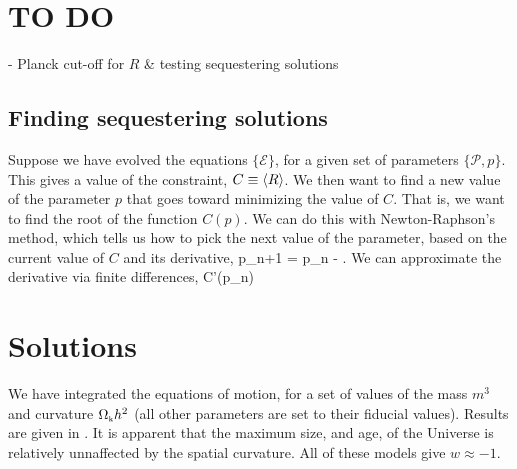 \documentclass[amsmath,amssymb,12pt,eqsecnum]{revtex4}
\newcommand{\note}[1]{{\color{blue}#1}}
\begin{document}
\note{
\section{TO DO}
- Planck cut-off for $R$ \& testing sequestering solutions

\subsection{Finding sequestering solutions}
Suppose we have evolved the equations $\{\mathcal{E}\}$, for a given set of parameters $\{\mathcal{P},p\}$. This gives a value of the constraint, $C \equiv \left\langle R\right\rangle$. We then want to find a new value of the parameter $p$ that goes toward minimizing the value of $C$. That is, we want to find the root of the function $C(p)$. We can do this with Newton-Raphson's method, which tells us how to pick the next value of the parameter, based on the current value of $C$ and its derivative,
\bea
p_{n+1} = p_n - \frac{C(p_n)}{C'(p_n)}.
\eea
We can approximate the derivative via finite differences,
\bea
C'(p_n) \approx \frac{C(p_n + \Delta) - C(p_n - \Delta)}{2\Delta}
\eea
}

\clearpage
\section{Solutions}
We have integrated the equations of motion, for a set of values of the mass $m^3$ and curvature ${\Omega}_{\scriptscriptstyle{\textrm{k}}}h^2$ (all other parameters are set to their fiducial values). Results are given in . It is apparent that the maximum size, and age, of the Universe is relatively unnaffected by the spatial curvature. All of these models give $w\approx -1$.
\end{document}

